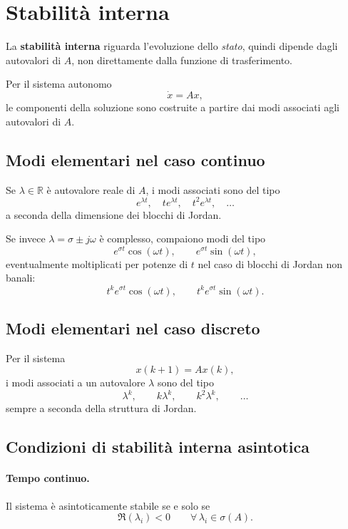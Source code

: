 \bigskip

\section{Stabilità interna}

La \textbf{stabilità interna} riguarda l'evoluzione dello \emph{stato}, quindi dipende dagli autovalori di \(A\), non direttamente dalla funzione di trasferimento.

\medskip

\noindent
Per il sistema autonomo
\[
\dot x = Ax,
\]
le componenti della soluzione sono costruite a partire dai modi associati agli autovalori di \(A\).

\subsection{Modi elementari nel caso continuo}

Se \(\lambda\in\mathbb{R}\) è autovalore reale di \(A\), i modi associati sono del tipo
\[
e^{\lambda t},\quad
t e^{\lambda t},\quad
t^2 e^{\lambda t},\quad \dots
\]
a seconda della dimensione dei blocchi di Jordan.

Se invece \(\lambda=\sigma\pm j\omega\) è complesso, compaiono modi del tipo
\[
e^{\sigma t}\cos(\omega t),\qquad
e^{\sigma t}\sin(\omega t),
\]
eventualmente moltiplicati per potenze di \(t\) nel caso di blocchi di Jordan non banali:
\[
t^k e^{\sigma t}\cos(\omega t),\qquad
t^k e^{\sigma t}\sin(\omega t).
\]

\subsection{Modi elementari nel caso discreto}

Per il sistema
\[
x(k+1)=Ax(k),
\]
i modi associati a un autovalore \(\lambda\) sono del tipo
\[
\lambda^k,\qquad
k\lambda^k,\qquad
k^2\lambda^k,\qquad \dots
\]
sempre a seconda della struttura di Jordan.

\subsection{Condizioni di stabilità interna asintotica}

\paragraph{Tempo continuo.}
Il sistema è asintoticamente stabile se e solo se
\[
\Re(\lambda_i)<0
\qquad \forall\, \lambda_i\in\sigma(A).
\]

